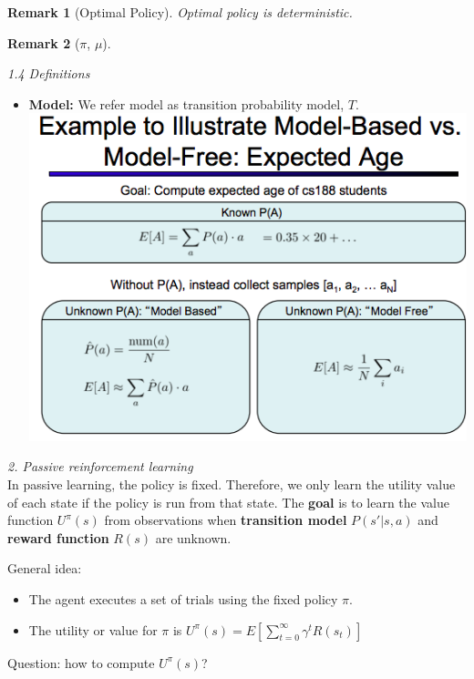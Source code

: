 \documentclass[12pt]{article}
\newtheorem*{remark}{Remark}
\begin{document}
\begin{remark}[Optimal Policy]
Optimal policy is deterministic.
\end{remark}
\begin{remark}[$\pi$, $\mu$]
\end{remark}

\noindent
\textsl{1.4 Definitions}
\begin{itemize}
\item \textbf{Model:} We refer model as transition probability model, $T$.\\

\includegraphics[scale=0.6]{model}\\
\end{itemize}


\noindent
\textsl{2. Passive reinforcement learning}\\

\noindent
In passive learning, the policy is fixed. Therefore, we only learn the utility value of each state if the policy is run from that state. The \textbf{goal} is to learn the value function $U^\pi (s)$ from observations when \textbf{transition model} $P(s' | s, a)$ and \textbf{reward function} $R(s)$ are unknown.  \\

\begin{tcolorbox}
General idea:
\begin{itemize}
\item The agent executes a set of trials using the fixed policy $\pi$.
\item The utility or value for $\pi$ is $U^\pi (s) = E[\sum_{t=0}^{\infty} \gamma ^t R(s_t)]$
\end{itemize}
Question: how to compute $U^\pi (s)$?
\end{tcolorbox}
\end{document}
